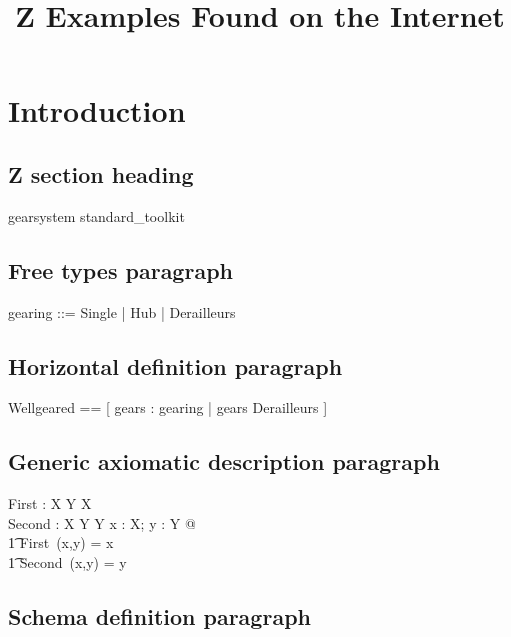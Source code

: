 \documentclass[letterpaper,11pt]{article}
\title{Z Examples Found on the Internet}
\begin{document}
\maketitle

\section{Introduction}

\subsection{Z section heading}

    \begin{zsection}
    \SECTION gearsystem \parents standard\_toolkit
    \end{zsection}

\subsection{Free types paragraph}

    \begin{zed}
    gearing ::= Single | Hub \ldata \nat \rdata
        | Derailleurs \ldata \nat \cross \nat \rdata
    \end{zed}

\subsection{Horizontal definition paragraph}

    \begin{zed}
    Wellgeared == [ gears : gearing | gears \in \ran Derailleurs ]
    \end{zed}

\subsection{Generic axiomatic description paragraph}

    \begin{gendef}[X,Y]
    First : X \cross Y \fun X \\
    Second : X \cross Y \fun Y
    \where
    \forall x : X; y : Y @ \\
    \t1     First~(x,y) = x \land \\
    \t1     Second~(x,y) = y
    \end{gendef}

\subsection{Schema definition paragraph}
\end{document}
